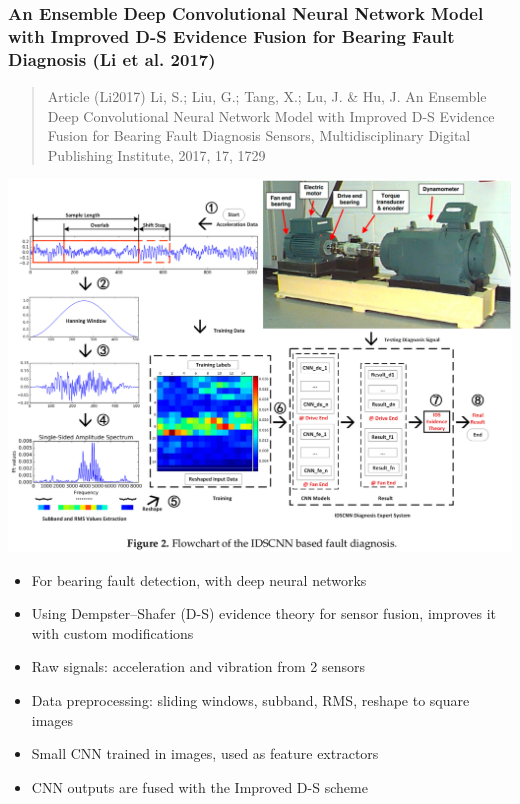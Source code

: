 \documentclass[
  letterpaper,
  DIV=11,
  numbers=noendperiod]{scrartcl}
\providecommand{\tightlist}{%
  \setlength{\itemsep}{0pt}\setlength{\parskip}{0pt}}\usepackage{longtable,booktabs,array}
\begin{document}
\hypertarget{an-ensemble-deep-convolutional-neural-network-model-with-improved-d-s-evidence-fusion-for-bearing-fault-diagnosis-li2017}{%
\subsubsection{An Ensemble Deep Convolutional Neural Network Model with
Improved D-S Evidence Fusion for Bearing Fault Diagnosis (Li et al.
2017)}\label{an-ensemble-deep-convolutional-neural-network-model-with-improved-d-s-evidence-fusion-for-bearing-fault-diagnosis-li2017}}

\begin{quote}
Article (Li2017) Li, S.; Liu, G.; Tang, X.; Lu, J. \& Hu, J. An Ensemble
Deep Convolutional Neural Network Model with Improved D-S Evidence
Fusion for Bearing Fault Diagnosis Sensors, Multidisciplinary Digital
Publishing Institute, 2017, 17, 1729
\end{quote}

\includegraphics{img/2023-01-08-19-37-45.png}

\begin{itemize}
\tightlist
\item
  For bearing fault detection, with deep neural networks
\item
  Using Dempster--Shafer (D-S) evidence theory for sensor fusion,
  improves it with custom modifications
\item
  Raw signals: acceleration and vibration from 2 sensors
\item
  Data preprocessing: sliding windows, subband, RMS, reshape to square
  images
\item
  Small CNN trained in images, used as feature extractors
\item
  CNN outputs are fused with the Improved D-S scheme
\end{itemize}
\end{document}
